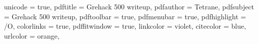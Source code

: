 
\usepackage[utf8]{inputenc}
\usepackage[T1]{fontenc}







\usepackage[titletoc]{appendix}

\usepackage{csquotes}

\usepackage[sorting=anyt,sortcites=true,backend=biber,url=false,doi=false,maxnames=7,isbn=false,firstinits=true,style=numeric]{biblatex}
% 




\usepackage[english]{babel}

\usepackage{braket}
\usepackage{amsmath,amssymb,mathtools,amsthm}
\usepackage{nicefrac}
\usepackage{stmaryrd}
\usepackage{xfrac}


\usepackage{algorithm2e}
\SetAlFnt{\small}

\usepackage{hyperref}
\hypersetup
{
  unicode         = true,
  pdftitle        = Grehack 500 writeup,
  pdfauthor       = Tetrane, %
  pdfsubject      = Grehack 500 writeup,
  pdftoolbar      = true, %
  pdfmenubar      = true, %
  pdfhighlight    = /O, %
  colorlinks      = true, %
  pdffitwindow    = true, %
  linkcolor       = violet, %
  citecolor       = blue, %
  urlcolor        = orange, %
}

